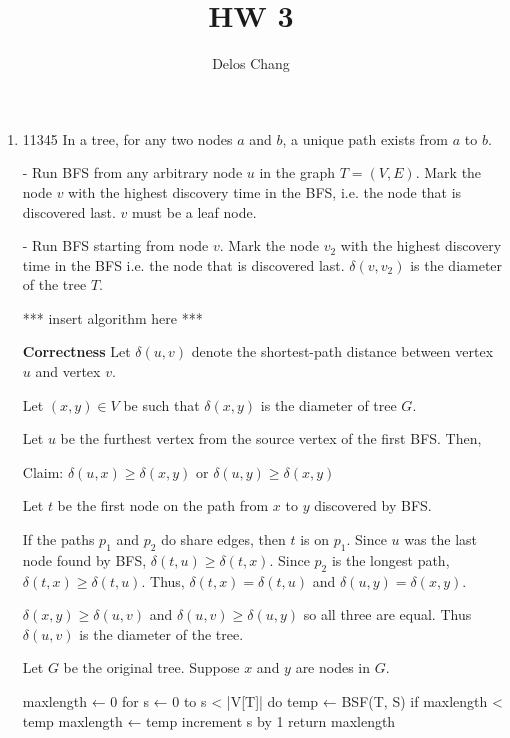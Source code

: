 \documentclass[a4paper]{report}
\title{HW 3}
\author{Delos Chang}
\date{}
\begin{document}
  \begin{enumerate}
    \item
      11345
      In a tree, for any two nodes $a$ and $b$, a unique path exists from $a$ to $b$.

      - Run BFS from any arbitrary node $u$ in the graph $T=(V,E)$. Mark the node $v$ with the highest discovery time in the BFS, 
      i.e. the node that is discovered last. $v$ must be a leaf node. 

      - Run BFS starting from node $v$. Mark the node $v_2$ with the highest discovery time in the BFS i.e. the node that is discovered last. 
      $\delta(v,v_2)$ is the diameter of the tree $T$. 

      *** insert algorithm here ***

      {\bf Correctness}
      Let $\delta(u,v)$ denote the shortest-path distance between vertex $u$ and vertex $v$.

      Let $(x,y) \in V$ be such that $\delta(x,y)$ is the diameter of tree $G$.

      Let $u$ be the furthest vertex from the source vertex of the first BFS. Then, 

      Claim: $\delta(u,x) \geq \delta(x,y)$ or $\delta(u,y) \geq \delta(x,y)$

      
      Let $t$ be the first node on the path from $x$ to $y$ discovered by BFS.

      If the paths $p_{1}$ and $p_{2}$ do share edges, then $t$ is on $p_{1}$. Since $u$ was the last node 
      found by BFS, $\delta(t,u) \geq \delta(t,x)$. Since $p_{2}$ is the longest path, $\delta(t,x) \geq \delta(t, u).$
      Thus, $\delta(t, x) = \delta(t, u)$ and $\delta(u, y) = \delta(x,y)$.


      $\delta(x,y) \geq \delta(u, v)$ and $\delta(u, v) \geq \delta(u, y)$ so all three are equal. Thus $\delta(u, v)$
      is the diameter of the tree.




      Let $G$ be the original tree. Suppose $x$ and $y$ are nodes in $G$. 

      maxlength ← 0
for s ← 0 to s < |V[T]|
      do temp ← BSF(T, S)
            if maxlength < temp
                   maxlength ← temp
                   increment s by 1
return maxlength




    \par
    \bigskip


\end{enumerate}
\end{document}
